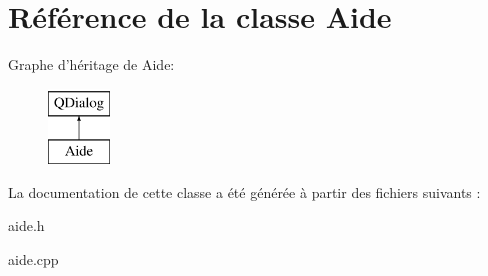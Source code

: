 \section{Référence de la classe Aide}
\label{class_aide}
Graphe d'héritage de Aide\-:\begin{figure}[H]
\begin{center}
\leavevmode
\includegraphics[height=2.000000cm]{class_aide}
\end{center}
\end{figure}


La documentation de cette classe a été générée à partir des fichiers suivants \-:\begin{DoxyCompactItemize}
\item 
aide.\-h\item 
aide.\-cpp\end{DoxyCompactItemize}
